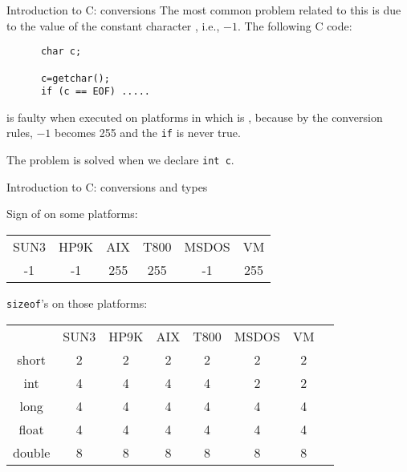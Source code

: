 \begin{frame}[fragile]{Introduction to C: conversions}
The most common problem related to this is due to the value of
the constant character \EOF, i.e., $-1$.
The following C code:


\vspace{20pt}

\begin{tt}
\begin{verbatim}
      char c;

      c=getchar();
      if (c == EOF) .....
\end{verbatim}
\end{tt}


\vspace{20pt}

is faulty when executed on platforms in which \Char is \UNS{}, because
by the conversion rules, $-1$ becomes 255 and the \verb"if" is never
true.


\vspace{20pt}

The problem is solved when we declare \verb"int c".


\end{frame}
\begin{frame}[fragile]{Introduction to C: conversions and types}

Sign of \EOF{} on some platforms:


\vspace{20pt}

\begin{tabular}{cccccc}
SUN3 & HP9K & AIX & T800 & MSDOS & VM\\
-1&-1&255&255&-1&255
\end{tabular}


\vspace{20pt}

\verb"sizeof"'s on those platforms:


\vspace{20pt}

\begin{tabular}{cccccccc}
 & SUN3 & HP9K & AIX & T800 & MSDOS & VM\\
short & 2&2&2&2&2&2\\
int & 4&4&4&4&2&2\\
long & 4&4&4&4&4&4\\
float & 4&4&4&4&4&4\\
double & 8&8&8&8&8&8
\end{tabular}

\end{frame}
